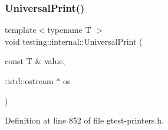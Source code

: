 \mbox{\label{namespacetesting_1_1internal_a30708fa2bacf11895b03bdb21eb72309}} 
\subsubsection{\texorpdfstring{Universal\+Print()}{UniversalPrint()}}
{\footnotesize\ttfamily template$<$typename T $>$ \\
void testing\+::internal\+::\+Universal\+Print (\begin{DoxyParamCaption}\item[{const T \&}]{value,  }\item[{\+::std\+::ostream $\ast$}]{os }\end{DoxyParamCaption})}



Definition at line 852 of file gtest-\/printers.\+h.



